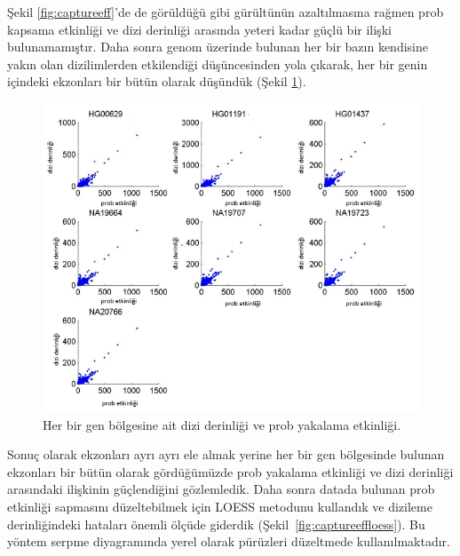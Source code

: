 \documentclass[11pt]{article}
\begin{document}
 Şekil \ref{fig:captureeff}'de de görüldüğü gibi gürültünün azaltılmasına rağmen prob kapsama etkinliği ve dizi derinliği arasında yeteri kadar güçlü bir ilişki bulunamamıştır. Daha sonra genom üzerinde bulunan her bir bazın kendisine yakın olan dizilimlerden etkilendiği düşüncesinden yola 
çıkarak, her bir genin içindeki ekzonları bir bütün olarak düşündük (Şekil \ref{fig:captureeffgene}).

\begin{figure}[htb]
\begin{center}
  \includegraphics[scale=0.65]{captureeff-gene.png}
\end{center}
\caption{Her bir gen bölgesine ait dizi derinliği ve prob yakalama etkinliği.}
\label{fig:captureeffgene}
\end{figure}

  Sonuç olarak ekzonları ayrı ayrı ele almak yerine her bir gen bölgesinde bulunan ekzonları bir bütün olarak gördüğümüzde prob yakalama etkinliği ve dizi derinliği arasındaki ilişkinin güçlendiğini gözlemledik. Daha sonra datada bulunan prob etkinliği sapmasını düzeltebilmek için LOESS metodunu kullandık ve dizileme derinliğindeki hataları önemli ölçüde giderdik (Şekil~\ref{fig:captureeffloess}). Bu yöntem serpme diyagramında yerel olarak pürüzleri düzeltmede kullanılmaktadır.
\end{document}
